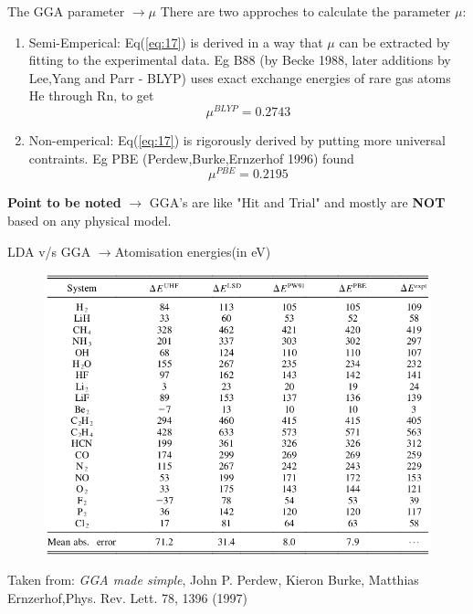 \documentclass{beamer}
\begin{document}
	\begin{frame}[t]{The GGA parameter $\rightarrow \mu$}
	There are two approches to calculate the parameter $\mu$:
	\begin{enumerate}
	\item{Semi-Emperical: } Eq(\ref{eq:17}) is derived in a way that $\mu$ can be extracted by fitting to the experimental data. Eg B88 (by Becke 1988, later additions by Lee,Yang and Parr - BLYP) uses exact exchange energies of rare gas atoms He through Rn, to get 
	\begin{equation}\label{eq:19}
	\mu^{BLYP} = 0.2743
	\end{equation}
	\item{Non-emperical:} Eq(\ref{eq:17}) is rigorously derived by putting more universal contraints. Eg PBE (Perdew,Burke,Ernzerhof 1996) found
	\begin{equation}\label{eq:20}
	\mu^{PBE} = 0.2195
	\end{equation}
	\end{enumerate}
	\textbf{Point to be noted} $\rightarrow$ GGA's are like "Hit and Trial" and mostly are \textbf{NOT} based on any physical model.
	\end{frame}
	
	\begin{frame}[t]{LDA v/s GGA $\rightarrow$Atomisation energies(in eV)}
	\begin{figure}
	\centering
	\includegraphics[scale=0.35]{Atomisation_energies_table.png}
	\end{figure}
	Taken from: \textit{GGA made simple}, John P. Perdew, Kieron Burke, Matthias Ernzerhof,Phys. Rev. Lett. 78, 1396 (1997)
	\end{frame}
	
\end{document}
